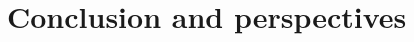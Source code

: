 \documentclass{sintefbeamer}
\begin{document}


\section{Conclusion and perspectives}
\section*{}
\end{document}
